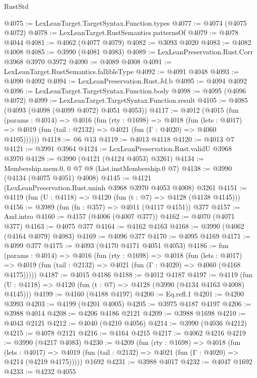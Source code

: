 \begin{lexlean}{RustStd}
\begin{coremodule}
{\begin{coremodule}
{{{{{{{{{{{{{{{{@4075 := LexLeanTarget.TargetSyntax.Function.types
@4077 := @4074 (@4075 @4072)
@4078 := LexLeanTarget.RustSemantics.patternsOf
@4079 := @4078 @4044
@4081 := @4062 (@4077 @4079)
@4082 := @3093 @4020
@4083 := @4082 @4008
@4085 := @3990 (@4081 @4083)
@4089 := LexLeanPreservation.Rust.Corr @3968 @3970 @3972
@4090 := @4089 @4008
@4091 := LexLeanTarget.RustSemantics.fallibleType
@4092 := @4091 @4048
@4093 := @4090 @4092
@4094 := LexLeanPreservation.Rust.Jd.b
@4095 := @4094 @4092
@4096 := LexLeanTarget.TargetSyntax.Function.body
@4098 := @4095 (@4096 @4072)
@4099 := LexLeanTarget.TargetSyntax.Function.result
@4105 := @4085 (@4093 (@4098 (@4099 @4072) @4051 @4053))
@4117 := @4012
    (@4015
      (fun (params : @4014) =>
      @4016
        (fun (rty : @1698) =>
        @4018
          (fun (lets : @4017) =>
          @4019 (fun (tail : @2132) => @4021 (fun (Γ : @4020) => @4060 @4105))))))
@4118 := @6 @13
@4119 := @4013 @4118
@4120 := @4013 @7
@4121 := @3991 @3964
@4124 := LexLeanPreservation.Rust.validU @3968 @3970
@4128 := @3990 (@4121 (@4124 @4053) @3261)
@4134 := Membership.mem.{0, 0} @7 @8 (List.instMembership.{0} @7)
@4138 := @3990 (@4134 (@4075 @4051) @4008)
@4145 := @4121 (LexLeanPreservation.Rust.uninh @3968 @3970 @4053 @4008) @3261
@4151 := @4119 (fun (U : @4118) => @4120 (fun (t : @7) => @4128 (@4138 @4145)))
@4156 := @3989 (fun (fn : @357) => @4011 (@4117 @4151)) @377
@4157 := And.intro
@4160 := @4157 (@4006 (@4007 @377))
@4162 := @4070 (@4071 @377)
@4163 := @4075 @377
@4164 := @4162 @4163
@4168 := @3990 (@4062 (@4164 @4079) @4083)
@4169 := @4096 @377
@4170 := @4095 @4169
@4171 := @4099 @377
@4175 := @4093 (@4170 @4171 @4051 @4053)
@4186 := fun (params : @4014) =>
  @4016
    (fun (rty : @1698) =>
    @4018
      (fun (lets : @4017) =>
      @4019 (fun (tail : @2132) => @4021 (fun (Γ : @4020) => @4060 (@4168 @4175)))))
@4187 := @4015 @4186
@4188 := @4012 @4187
@4197 := @4119 (fun (U : @4118) => @4120 (fun (t : @7) => @4128 (@3990 (@4134 @4163 @4008) @4145)))
@4199 := @4160 (@4188 @4197)
@4200 := Eq.refl.{1}
@4201 := @4200 @3993
@4203 := @4199 (@4201 @4005)
@4205 := @3975 @4187 @4197
@4206 := @3988 @4014
@4208 := @4206 @4186 @2121
@4209 := @3988 @1698
@4210 := @4043 @2121
@4212 := @4040 (@4210 @4056)
@4214 := @3990 (@4036 @4212)
@4215 := @4078 @2121
@4216 := @4164 @4215
@4217 := @4062 @4216
@4219 := @3990 (@4217 @4083)
@4230 := @4209
    (fun (rty : @1698) =>
    @4018
      (fun (lets : @4017) =>
      @4019 (fun (tail : @2132) => @4021 (fun (Γ : @4020) => @4214 (@4219 @4175)))))
    @1692
@4231 := @3988 @4017
@4232 := @4047 @1692
@4233 := @4232 @4055
}}}}}}}}}}}}}}}}
\end{coremodule}}
\end{coremodule}
\end{lexlean}
